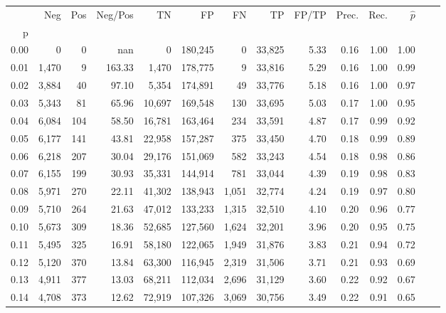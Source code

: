 \begin{tabular}{rrrrrrrrrrrrrr}
\toprule
{} &    Neg &  Pos & Neg/Pos &       TN &       FP &      FN &      TP & FP/TP & Prec. &  Rec. & $\hat{p}$ \\
p    &        &      &         &          &          &         &         &       &       &       &           \\
\midrule
0.00 &      0 &    0 &     nan &        0 &  180,245 &       0 &  33,825 &  5.33 &  0.16 &  1.00 &      1.00 \\
0.01 &  1,470 &    9 &  163.33 &    1,470 &  178,775 &       9 &  33,816 &  5.29 &  0.16 &  1.00 &      0.99 \\
0.02 &  3,884 &   40 &   97.10 &    5,354 &  174,891 &      49 &  33,776 &  5.18 &  0.16 &  1.00 &      0.97 \\
0.03 &  5,343 &   81 &   65.96 &   10,697 &  169,548 &     130 &  33,695 &  5.03 &  0.17 &  1.00 &      0.95 \\
0.04 &  6,084 &  104 &   58.50 &   16,781 &  163,464 &     234 &  33,591 &  4.87 &  0.17 &  0.99 &      0.92 \\
0.05 &  6,177 &  141 &   43.81 &   22,958 &  157,287 &     375 &  33,450 &  4.70 &  0.18 &  0.99 &      0.89 \\
0.06 &  6,218 &  207 &   30.04 &   29,176 &  151,069 &     582 &  33,243 &  4.54 &  0.18 &  0.98 &      0.86 \\
0.07 &  6,155 &  199 &   30.93 &   35,331 &  144,914 &     781 &  33,044 &  4.39 &  0.19 &  0.98 &      0.83 \\
0.08 &  5,971 &  270 &   22.11 &   41,302 &  138,943 &   1,051 &  32,774 &  4.24 &  0.19 &  0.97 &      0.80 \\
0.09 &  5,710 &  264 &   21.63 &   47,012 &  133,233 &   1,315 &  32,510 &  4.10 &  0.20 &  0.96 &      0.77 \\
0.10 &  5,673 &  309 &   18.36 &   52,685 &  127,560 &   1,624 &  32,201 &  3.96 &  0.20 &  0.95 &      0.75 \\
0.11 &  5,495 &  325 &   16.91 &   58,180 &  122,065 &   1,949 &  31,876 &  3.83 &  0.21 &  0.94 &      0.72 \\
0.12 &  5,120 &  370 &   13.84 &   63,300 &  116,945 &   2,319 &  31,506 &  3.71 &  0.21 &  0.93 &      0.69 \\
0.13 &  4,911 &  377 &   13.03 &   68,211 &  112,034 &   2,696 &  31,129 &  3.60 &  0.22 &  0.92 &      0.67 \\
0.14 &  4,708 &  373 &   12.62 &   72,919 &  107,326 &   3,069 &  30,756 &  3.49 &  0.22 &  0.91 &      0.65 \\

\end{tabular}
